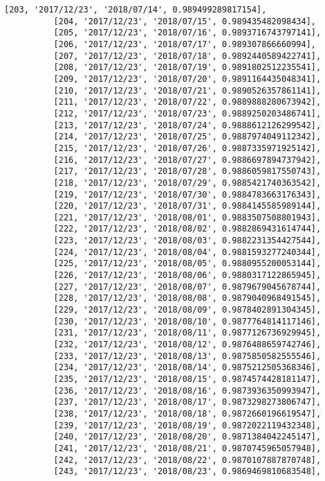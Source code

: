 \documentclass[11pt]{article}
\begin{document}
\begin{Verbatim}[commandchars=\\\{\}]
          [203, '2017/12/23', '2018/07/14', 0.989499289817154],
          [204, '2017/12/23', '2018/07/15', 0.989435482098434],
          [205, '2017/12/23', '2018/07/16', 0.9893716743797141],
          [206, '2017/12/23', '2018/07/17', 0.989307866660994],
          [207, '2017/12/23', '2018/07/18', 0.9892440589422741],
          [208, '2017/12/23', '2018/07/19', 0.9891802512235541],
          [209, '2017/12/23', '2018/07/20', 0.9891164435048341],
          [210, '2017/12/23', '2018/07/21', 0.9890526357861141],
          [211, '2017/12/23', '2018/07/22', 0.9889888280673942],
          [212, '2017/12/23', '2018/07/23', 0.9889250203486741],
          [213, '2017/12/23', '2018/07/24', 0.9888612126299542],
          [214, '2017/12/23', '2018/07/25', 0.9887974049112342],
          [215, '2017/12/23', '2018/07/26', 0.9887335971925142],
          [216, '2017/12/23', '2018/07/27', 0.9886697894737942],
          [217, '2017/12/23', '2018/07/28', 0.9886059817550743],
          [218, '2017/12/23', '2018/07/29', 0.9885421740363542],
          [219, '2017/12/23', '2018/07/30', 0.9884783663176343],
          [220, '2017/12/23', '2018/07/31', 0.9884145585989144],
          [221, '2017/12/23', '2018/08/01', 0.9883507508801943],
          [222, '2017/12/23', '2018/08/02', 0.9882869431614744],
          [223, '2017/12/23', '2018/08/03', 0.9882231354427544],
          [224, '2017/12/23', '2018/08/04', 0.9881593277240344],
          [225, '2017/12/23', '2018/08/05', 0.9880955200053144],
          [226, '2017/12/23', '2018/08/06', 0.9880317122865945],
          [227, '2017/12/23', '2018/08/07', 0.9879679045678744],
          [228, '2017/12/23', '2018/08/08', 0.9879040968491545],
          [229, '2017/12/23', '2018/08/09', 0.9878402891304345],
          [230, '2017/12/23', '2018/08/10', 0.9877764814117146],
          [231, '2017/12/23', '2018/08/11', 0.9877126736929945],
          [232, '2017/12/23', '2018/08/12', 0.9876488659742746],
          [233, '2017/12/23', '2018/08/13', 0.9875850582555546],
          [234, '2017/12/23', '2018/08/14', 0.9875212505368346],
          [235, '2017/12/23', '2018/08/15', 0.9874574428181147],
          [236, '2017/12/23', '2018/08/16', 0.9873936350993947],
          [237, '2017/12/23', '2018/08/17', 0.9873298273806747],
          [238, '2017/12/23', '2018/08/18', 0.9872660196619547],
          [239, '2017/12/23', '2018/08/19', 0.9872022119432348],
          [240, '2017/12/23', '2018/08/20', 0.9871384042245147],
          [241, '2017/12/23', '2018/08/21', 0.9870745965057948],
          [242, '2017/12/23', '2018/08/22', 0.9870107887870748],
          [243, '2017/12/23', '2018/08/23', 0.9869469810683548],

\end{Verbatim}
\end{document}
